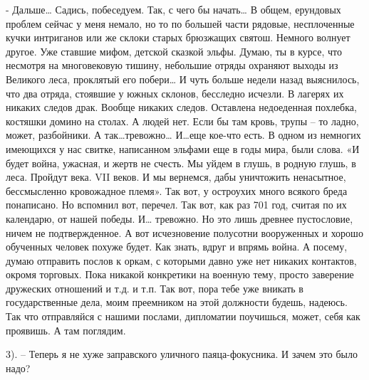 \documentclass[12pt,a4paper]{book}
\begin{document}
- Дальше… Садись, побеседуем. Так, с чего бы начать… В общем, ерундовых проблем сейчас у меня немало, но то по большей части рядовые, несплоченные кучки интриганов или же склоки старых брюзжащих святош. Немного волнует другое. Уже ставшие мифом, детской сказкой эльфы. Думаю, ты в курсе, что несмотря на многовековую тишину, небольшие отряды охраняют выходы из Великого леса, проклятый его побери… И чуть больше недели назад выяснилось, что два отряда, стоявшие у южных склонов, бесследно исчезли. В лагерях их никаких следов драк. Вообще никаких следов. Оставлена недоеденная похлебка, костяшки домино на столах. А людей нет. Если бы там кровь, трупы – то ладно, может, разбойники. А так…тревожно… И…еще кое-что есть. В одном из немногих имеющихся у нас свитке, написанном эльфами еще в годы мира, были слова. «И будет война, ужасная, и жертв не счесть. Мы уйдем в глушь, в родную глушь, в леса. Пройдут века. VII веков. И мы вернемся, дабы уничтожить ненасытное, бессмысленно кровожадное племя». Так вот, у остроухих много всякого бреда понаписано. Но вспомнил вот, перечел. Так вот, как раз 701 год, считая по их календарю, от нашей победы. И… тревожно. Но это лишь древнее пустословие, ничем не подтвержденное. А вот исчезновение полусотни вооруженных и хорошо обученных человек похуже будет. Как знать, вдруг и впрямь война. А посему, думаю отправить послов к оркам, с которыми давно уже нет никаких контактов, окромя торговых. Пока никакой конкретики на военную тему, просто заверение дружеских отношений и т.д. и т.п. Так вот, пора тебе уже вникать в государственные дела, моим преемником на этой должности будешь, надеюсь. Так что отправляйся с нашими послами, дипломатии поучишься, может, себя как проявишь. А там поглядим.

3). – Теперь я не хуже заправского уличного паяца-фокусника. И зачем это было надо?
\end{document}
